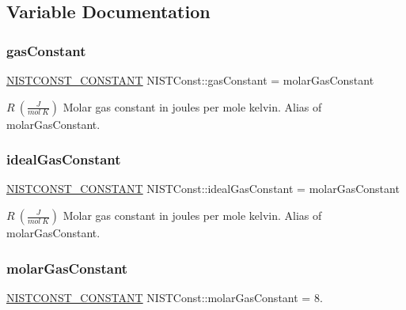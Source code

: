\subsection{Variable Documentation}
\mbox{\label{group___n_i_s_t_const-_molar_gas_constant_gaede5054fb870899eca0b8c4b6ed2aed2}} 
\subsubsection{\texorpdfstring{gas\+Constant}{gasConstant}}
{\footnotesize\ttfamily \mbox{\hyperlink{group___n_i_s_t_const-_macros_ga2b0fc1d7452373f816175dd86ce26729}{N\+I\+S\+T\+C\+O\+N\+S\+T\+\_\+\+C\+O\+N\+S\+T\+A\+NT}} N\+I\+S\+T\+Const\+::gas\+Constant = molar\+Gas\+Constant}

$R \ (\frac{J}{mol\ K})$ Molar gas constant in joules per mole kelvin. Alias of molar\+Gas\+Constant. \mbox{\label{group___n_i_s_t_const-_molar_gas_constant_ga7de422ba1c8713e8e8596ac1e1da8646}} 
\subsubsection{\texorpdfstring{ideal\+Gas\+Constant}{idealGasConstant}}
{\footnotesize\ttfamily \mbox{\hyperlink{group___n_i_s_t_const-_macros_ga2b0fc1d7452373f816175dd86ce26729}{N\+I\+S\+T\+C\+O\+N\+S\+T\+\_\+\+C\+O\+N\+S\+T\+A\+NT}} N\+I\+S\+T\+Const\+::ideal\+Gas\+Constant = molar\+Gas\+Constant}

$R \ (\frac{J}{mol\ K})$ Molar gas constant in joules per mole kelvin. Alias of molar\+Gas\+Constant. \mbox{\label{group___n_i_s_t_const-_molar_gas_constant_gac728faac7d754d8ddca4a4bd7565ec0e}} 
\subsubsection{\texorpdfstring{molar\+Gas\+Constant}{molarGasConstant}}
{\footnotesize\ttfamily \mbox{\hyperlink{group___n_i_s_t_const-_macros_ga2b0fc1d7452373f816175dd86ce26729}{N\+I\+S\+T\+C\+O\+N\+S\+T\+\_\+\+C\+O\+N\+S\+T\+A\+NT}} N\+I\+S\+T\+Const\+::molar\+Gas\+Constant = 8.}

